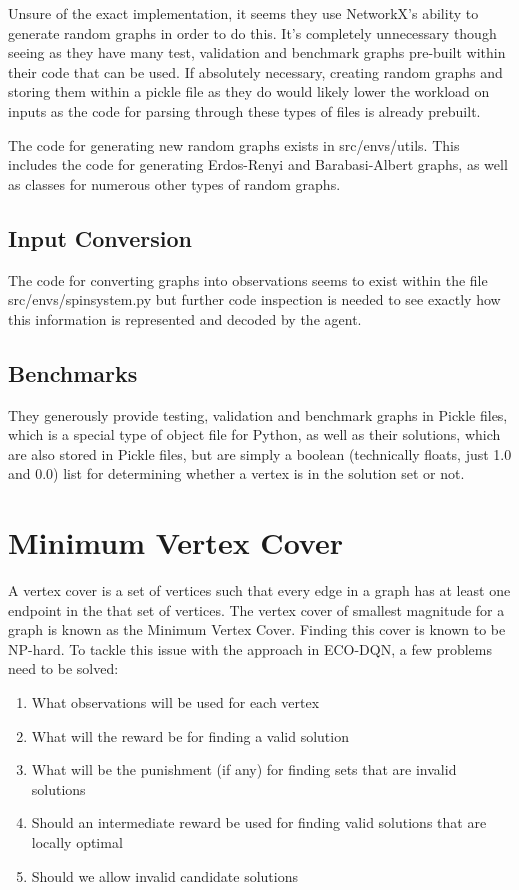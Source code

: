 \documentclass{article}
\begin{document}
Unsure of the exact implementation, it seems they use NetworkX's ability to generate random graphs in order to do this. It's completely unnecessary though seeing as they have many test, validation and benchmark graphs pre-built within their code that can be used. If absolutely necessary, creating random graphs and storing them within a pickle file as they do would likely lower the workload on inputs as the code for parsing through these types of files is already prebuilt.

The code for generating new random graphs exists in src/envs/utils. This includes the code for generating Erdos-Renyi and Barabasi-Albert graphs, as well as classes for numerous other types of random graphs.

\subsection{Input Conversion}

The code for converting graphs into observations seems to exist within the file src/envs/spinsystem.py but further code inspection is needed to see exactly how this information is represented and decoded by the agent.

\subsection{Benchmarks}

They generously provide testing, validation and benchmark graphs in Pickle files, which is a special type of object file for Python, as well as their solutions, which are also stored in Pickle files, but are simply a boolean (technically floats, just 1.0 and 0.0) list for determining whether a vertex is in the solution set or not.

\section{Minimum Vertex Cover}

A vertex cover is a set of vertices such that every edge in a graph has at least one endpoint in the that set of vertices. The vertex cover of smallest magnitude for a graph is known as the Minimum Vertex Cover. Finding this cover is known to be NP-hard. To tackle this issue with the approach in ECO-DQN, a few problems need to be solved:

\begin{enumerate}
    \item What observations will be used for each vertex 
    \item What will the reward be for finding a valid solution 
    \item What will be the punishment (if any) for finding sets that are invalid solutions 
    \item Should an intermediate reward be used for finding valid solutions that are locally optimal
    \item Should we allow invalid candidate solutions
\end{enumerate}
\end{document}
